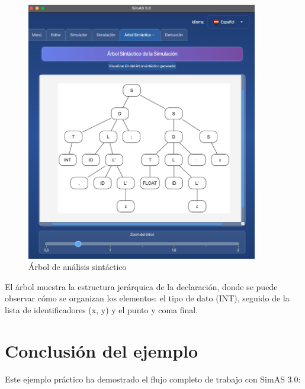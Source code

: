\needspace{8cm}
\begin{figure}[H]
    \centering
    \includegraphics[width=0.9\textwidth]{figuras/ejemplo_practico/simulacion_arbol1.png}
    \caption{Árbol de análisis sintáctico}
    \label{fig:ejemplo_simulacion_arbol}
\end{figure}

El árbol muestra la estructura jerárquica de la declaración, donde se puede observar cómo se organizan los elementos: el tipo de dato (INT), seguido de la lista de identificadores (x, y) y el punto y coma final.

\section{Conclusión del ejemplo}

Este ejemplo práctico ha demostrado el flujo completo de trabajo con SimAS 3.0:

